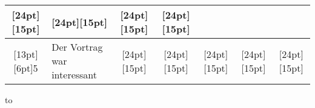 \documentclass[a4paper,12pt]{article}
\begin{document}
\begin{center}
\begin{tabular}{|c|l|c|c|c|c|c|}
\raisebox{0pt}[24pt][15pt]{\phantom{XX}}&
\raisebox{0pt}[24pt][15pt]{\phantom{XX}}&
\raisebox{0pt}[24pt][15pt]{\phantom{XX}}&
\raisebox{0pt}[24pt][15pt]{\phantom{XX}}\\
\hline
\raisebox{0pt}[13pt][6pt]{5}&
\begin{minipage}{6.6cm}\raggedright\strut
Der Vortrag war interessant
\strut\end{minipage}&
\raisebox{0pt}[24pt][15pt]{\phantom{XX}}&
\raisebox{0pt}[24pt][15pt]{\phantom{XX}}&
\raisebox{0pt}[24pt][15pt]{\phantom{XX}}&
\raisebox{0pt}[24pt][15pt]{\phantom{XX}}&
\raisebox{0pt}[24pt][15pt]{\phantom{XX}}\\
\hline
\end{tabular}
\end{center}

\vspace{0.8mm}
{\parindent0pt\hbox to}
\end{document}
